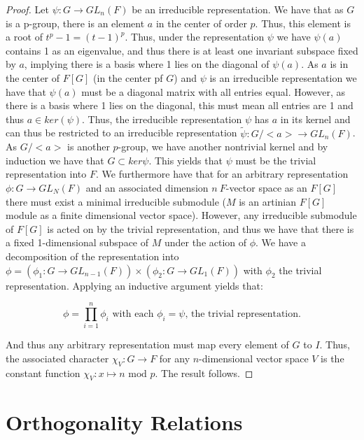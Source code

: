 \documentclass{article}
\begin{document}
\begin{proof}

  Let $\psi: G \to GL_{n}(F)$ be an irreducible representation. We have that as $G$ is a p-group, there is an element $a$ in the center of order $p$. Thus, this element is a root of $t^{p} - 1 = (t - 1)^{p}$. Thus, under the representation $\psi$ we have $\psi(a)$ contains 1 as an eigenvalue, and thus there is at least one invariant subspace fixed by $a$, implying there is a basis where 1 lies on the diagonal of $\psi(a)$. As $a$ is in the center of $F[G]$ (in the center pf $G$) and $\psi$ is an irreducible representation we have that $\psi(a)$ must be a diagonal matrix with all entries equal. However, as there is a basis where 1 lies on the diagonal, this must mean all entries are 1 and thus  $a \in ker(\psi)$. Thus, the irreducible representation $\psi$ has $a$ in its kernel and can thus be restricted to an irreducible representation $\widetilde\psi: G/<a> \to GL_{n}(F)$. As $G/<a>$ is another $p$-group, we have another nontrivial kernel and by induction we have that $G \subset ker\psi$. This yields that $\psi$ must be the trivial representation into $F$. We furthermore have that for an arbitrary representation $\phi: G \to GL_{N}(F)$ and an associated dimension $n \ F$-vector space as an $F[G]$ there must exist a minimal irreducible submodule ($M$ is an artinian $F[G]$ module as a finite dimensional vector space). However, any irreducible submodule of $F[G]$ is acted on by the trivial representation, and thus we have that there is a fixed 1-dimensional subspace of $M$ under the action of $\phi$. We have a decomposition of the representation into $\phi = (\phi_{1}: G \to GL_{n-1}(F)) \times (\phi_{2}: G \to GL_{1}(F))$ with $\phi_{2}$ the trivial representation. Applying an inductive argument yields that:

  \[
    \phi = \prod_{i=1}^{n}\phi_{i} \text{ with each } \phi_{i}= \psi \text{, the trivial representation.}
  \]
  
And thus any arbitrary representation must map every element of $G$ to $I$. Thus, the associated character $\chi_{V}:G \to F$ for any $n$-dimensional vector space $V$ is the constant function $\chi_{V}: x \mapsto n \text{ mod }p$. The result follows. \end{proof} 


\pagebreak 

\section{Orthogonality Relations}
\end{document}
